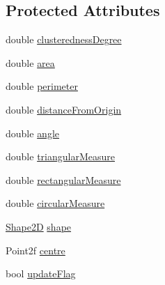 \subsection*{Protected Attributes}
\begin{DoxyCompactItemize}
\item 
double \hyperlink{classmultiscale_1_1analysis_1_1SpatialCollection2D_acd11d0bbeb60a1168bd2c2fbbc6fe965}{clusteredness\-Degree}
\item 
double \hyperlink{classmultiscale_1_1analysis_1_1SpatialCollection2D_ac570cc755e52aeb9deacf12d223a4a3a}{area}
\item 
double \hyperlink{classmultiscale_1_1analysis_1_1SpatialCollection2D_ae8045702b66fd813cfff49fa86b02e68}{perimeter}
\item 
double \hyperlink{classmultiscale_1_1analysis_1_1SpatialCollection2D_ac2a5d3f8c2cb878c710d821c536b8a4f}{distance\-From\-Origin}
\item 
double \hyperlink{classmultiscale_1_1analysis_1_1SpatialCollection2D_ab452753ab21ee26732afb77a6478b3ce}{angle}
\item 
double \hyperlink{classmultiscale_1_1analysis_1_1SpatialCollection2D_a578070e91858e9e87de1e0f5771d6c3f}{triangular\-Measure}
\item 
double \hyperlink{classmultiscale_1_1analysis_1_1SpatialCollection2D_aad7d79a7bd299d4d3c08a864cfcb77c3}{rectangular\-Measure}
\item 
double \hyperlink{classmultiscale_1_1analysis_1_1SpatialCollection2D_a4c58c82dd3d67d670b554bfaeb2b19ba}{circular\-Measure}
\item 
\hyperlink{namespacemultiscale_1_1analysis_ad1ef6155ab2e954c1c33d3e2e6b53fbf}{Shape2\-D} \hyperlink{classmultiscale_1_1analysis_1_1SpatialCollection2D_a4df95ecca90ce33332a69e0aefcf73d9}{shape}
\item 
Point2f \hyperlink{classmultiscale_1_1analysis_1_1SpatialCollection2D_afe9ef6b70ff53161cb02749444ae372c}{centre}
\item 
bool \hyperlink{classmultiscale_1_1analysis_1_1SpatialCollection2D_a6d942f2856adc673e9d361596744b37f}{update\-Flag}
\end{DoxyCompactItemize}
